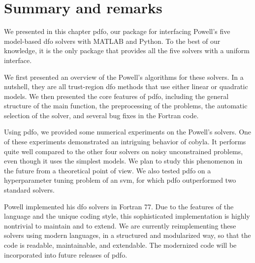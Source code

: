 \section{Summary and remarks}

We presented in this chapter \gls{pdfo}, our package for interfacing Powell's five model-based \gls{dfo} solvers with MATLAB and Python.
To the best of our knowledge, it is the only package that provides all the five solvers with a uniform interface.

We first presented an overview of the Powell's algorithms for these solvers.
In a nutshell, they are all trust-region \gls{dfo} methods that use either linear or quadratic models.
We then presented the core features of \gls{pdfo}, including the general structure of the main function, the preprocessing of the problems, the automatic selection of the solver, and several bug fixes in the Fortran code.

Using \gls{pdfo}, we provided some numerical experiments on the Powell's solvers.
One of these experiments demonstrated an intriguing behavior of \gls{cobyla}.
It performs quite well compared to the other four solvers on noisy unconstrained problems, even though it uses the simplest models.
We plan to study this phenomenon in the future from a theoretical point of view.
We also tested \gls{pdfo} on a hyperparameter tuning problem of an \gls{svm}, for which \gls{pdfo} outperformed two standard solvers.

Powell implemented his \gls{dfo} solvers in Fortran 77. Due to the features of the language and the unique coding style, this sophisticated implementation is highly nontrivial to maintain and to extend.
We are currently reimplementing these solvers using modern languages, in a structured and modularized way, so that the code is readable, maintainable, and extendable.
The modernized code will be incorporated into future releases of \gls{pdfo}.
